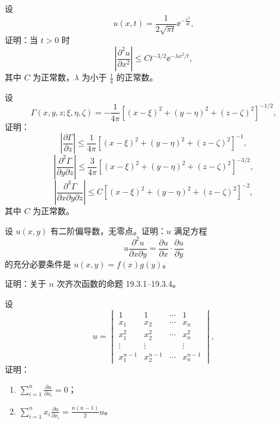 \begin{xreferenceproblem}[1]
设
  \[
    u(x,t)=\frac{1}{2\sqrt{\pi t}}\ee^{-\frac{x^2}{4t}},
  \]
  证明：当 $t>0$ 时
  \[
    \left|\frac{\partial^2u}{\partial x^2}\right|
    \le Ct^{-3/2}\ee^{-\lambda x^2/t},
  \]
  其中 $C$ 为正常数，$\lambda$ 为小于 $\frac14$ 的正常数。
\end{xreferenceproblem}

\begin{xreferenceproblem}[2]
设
  \[
    \Gamma(x,y,z;\xi,\eta,\zeta)
    =-\frac{1}{4\pi}[(x-\xi)^2+(y-\eta)^2+(z-\zeta)^2]^{-1/2},
  \]
  证明：
  \[
    \left|\frac{\partial\Gamma}{\partial z}\right|
    \le\frac1{4\pi}[(x-\xi)^2+(y-\eta)^2+(z-\zeta)^2]^{-1},
  \]
  \[
    \left|\frac{\partial^2\Gamma}{\partial y\partial z}\right|
    \le\frac3{4\pi}[(x-\xi)^2+(y-\eta)^2+(z-\zeta)^2]^{-3/2},
  \]
  \[
    \left|\frac{\partial^3\Gamma}{\partial x\partial y\partial z}\right|
    \le C[(x-\xi)^2+(y-\eta)^2+(z-\zeta)^2]^{-2},
  \]
  其中 $C$ 为正常数。
\end{xreferenceproblem}

\begin{xreferenceproblem}[3]
设 $u(x,y)$ 有二阶偏导数，无零点。证明：$u$ 满足方程
  \[
    u\frac{\partial^2u}{\partial x\partial y}
    =\frac{\partial u}{\partial x}\cdot\frac{\partial u}{\partial y}
  \]
  的充分必要条件是 $u(x,y)=f(x)g(y)$。
\end{xreferenceproblem}

\begin{xreferenceproblem}[4]
证明：关于 $n$ 次齐次函数的命题 19.3.1--19.3.4。
\end{xreferenceproblem}

\begin{xreferenceproblem}[5]
设
  \[
    u=
    \begin{vmatrix}
      1&1&\cdots&1\\
      x_1&x_2&\cdots&x_n\\
      x_1^2&x_2^2&\cdots&x_n^2\\
      \vdots&\vdots&&\vdots\\
      x_1^{n-1}&x_2^{n-1}&\cdots&x_n^{n-1}
    \end{vmatrix},
  \]
  证明：
  \begin{enumerate}[label=(\arabic*)]
    \item $\sum_{i=1}^n\frac{\partial u}{\partial x_i}=0$；
    \item $\sum_{i=1}^n x_i\frac{\partial u}{\partial x_i}=\frac{n(n-1)}2u$。
  \end{enumerate}
\end{xreferenceproblem}

